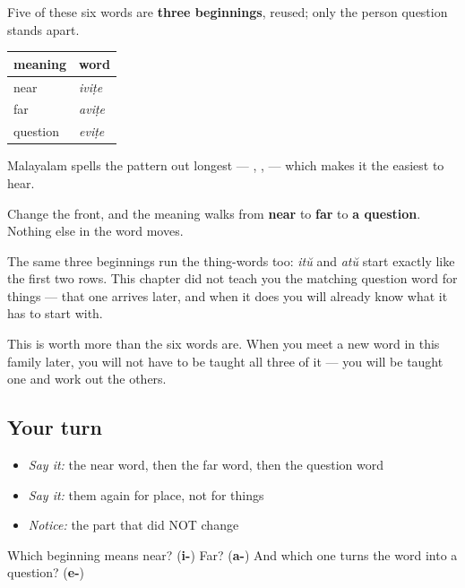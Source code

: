 \begin{grammarlens}[title={Grammar lens: one slot changes}]
Five of these six words are \textbf{three beginnings}, reused; only the person question stands apart.

\noindent
\begin{tabularx}{\linewidth}{@{}>{\raggedright\arraybackslash}X>{\raggedright\arraybackslash}X@{}}
\toprule
\textbf{meaning} & \textbf{word} \\
\midrule
near & \textbf{\ml{ഇവിടെ}} \emph{iviṭe} \\
far & \textbf{\ml{അവിടെ}} \emph{aviṭe} \\
question & \textbf{\ml{എവിടെ}} \emph{eviṭe} \\
\bottomrule
\end{tabularx}

Malayalam spells the pattern out longest — , ,  — which makes it the easiest to hear.

Change the front, and the meaning walks from \textbf{near} to \textbf{far} to \textbf{a question}. Nothing else in the word moves.

The same three beginnings run the thing-words too: \textbf{} \emph{itŭ} and \textbf{} \emph{atŭ} start exactly like the first two rows. This chapter did not teach you the matching question word for things — that one arrives later, and when it does you will already know what it has to start with.

This is worth more than the six words are. When you meet a new word in this family later, you will not have to be taught all three of it — you will be taught one and work out the others.
\end{grammarlens}

\subsection*{Your turn}
\begin{itemize}
\raggedright
  \item \emph{Say it:} the near word, then the far word, then the question word
  \item \emph{Say it:} them again for place, not for things
  \item \emph{Notice:} the part that did NOT change
\end{itemize}

\begin{tcolorbox}[breakable,colback=teal!4,colframe=teal!35!black,title={Before you move on}]
Which beginning means near? (\textbf{i-}) Far? (\textbf{a-}) And which one turns the word into a question? (\textbf{e-})
\end{tcolorbox}
